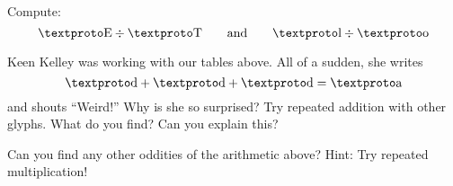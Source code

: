 \begin{prob} Compute:
\[
\lf \div \lc \qquad\text{and}\qquad \lh \div \li
\]
\end{prob}

\begin{prob} 
Keen Kelley was working with our tables above. All of a sudden, she
writes
\[
\loo + \loo + \loo = \lo
\]
and shouts ``Weird!'' Why is she so surprised? Try repeated addition
with other glyphs. What do you find? Can you explain this?
\end{prob}


\begin{prob}
Can you find any other oddities of the arithmetic above? Hint: Try
repeated multiplication!
\end{prob}


